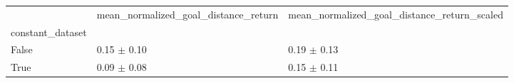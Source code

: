 \begin{tabular}{lll}
\toprule
 & mean_normalized_goal_distance_return & mean_normalized_goal_distance_return_scaled \\
constant_dataset &  &  \\
\midrule
False & 0.15 $\pm$ 0.10 & 0.19 $\pm$ 0.13 \\
True & 0.09 $\pm$ 0.08 & 0.15 $\pm$ 0.11 \\
\bottomrule
\end{tabular}
